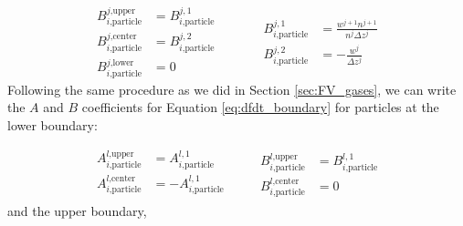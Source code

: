 \begin{equation*}
  \begin{aligned}
    B_{i\text{,particle}}^{j\text{,upper}} &= B_{i\text{,particle}}^{j,1} \\
    B_{i\text{,particle}}^{j\text{,center}} &= B_{i\text{,particle}}^{j,2} \\
    B_{i\text{,particle}}^{j\text{,lower}} &= 0
  \end{aligned}
  \quad\quad\quad
  \begin{aligned}
    B_{i\text{,particle}}^{j,1} &= \frac{w^{j+1}n^{j+1}}{n^j \Delta z^j} \\
    B_{i\text{,particle}}^{j,2} &= -\frac{ w^{j} }{\Delta z^j}
  \end{aligned}
\end{equation*}
Following the same procedure as we did in Section \ref{sec:FV_gases}, we can write the $A$ and $B$ coefficients for Equation \eqref{eq:dfdt_boundary} for particles at the lower boundary:


\begin{equation*}
  \begin{aligned}
  A_{i\text{,particle}}^{l\text{,upper}} &= A_{i\text{,particle}}^{l,1} \\
  A_{i\text{,particle}}^{l\text{,center}} &= - A_{i\text{,particle}}^{l,1} \\
  \end{aligned}
  \quad\quad
  \begin{aligned}
  B_{i\text{,particle}}^{l\text{,upper}} &= B_{i\text{,particle}}^{l,1} \\
  B_{i\text{,particle}}^{l\text{,center}} &= 0
  \end{aligned}
\end{equation*}
and the upper boundary,

